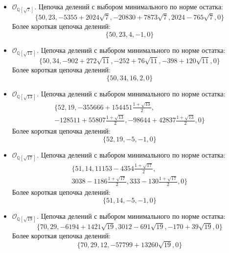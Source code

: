 \documentclass[_00_dissertation.tex]{subfiles}
\begin{document}
\begin{itemize}
    \item $\mathcal{O}_{\mathbb{Q}[\sqrt{7}]}$.
    Цепочка делений с выбором минимального по норме остатка:
    \begin{equation*}
        \{50, 23, -5355+2024\sqrt{7}, -20830+7873\sqrt{7}, 2024-765\sqrt{7}, 0\}
    \end{equation*}
    Более короткая цепочка делений:
    \begin{equation*}
        \{50, 23, 4, -1, 0\}
    \end{equation*}

    \item $\mathcal{O}_{\mathbb{Q}[\sqrt{11}]}$.
    Цепочка делений с выбором минимального по норме остатка:
    \begin{equation*}
        \{50, 34, -902+272\sqrt{11}, -252+76\sqrt{11}, -398+120\sqrt{11}, 0\}
    \end{equation*}
    Более короткая цепочка делений:
    \begin{equation*}
        \{50, 34, 16, 2, 0\}
    \end{equation*}

    \item $\mathcal{O}_{\mathbb{Q}[\sqrt{13}]}$.
    Цепочка делений с выбором минимального по норме остатка:
    \begin{multline*}
        \{52, 19, -355666+154451\frac{1+\sqrt{13}}{2},\\
        -128511+55807\frac{1+\sqrt{13}}{2}, -98644+42837\frac{1+\sqrt{13}}{2}, 0\}
    \end{multline*}
    Более короткая цепочка делений:
    \begin{equation*}
        \{52, 19, -5, -1, 0\}
    \end{equation*}

    \item $\mathcal{O}_{\mathbb{Q}[\sqrt{17}]}$.
    Цепочка делений с выбором минимального по норме остатка:
    \begin{multline*}
        \{51, 14, 11153-4354\frac{1+\sqrt{17}}{2},\\
        3038-1186\frac{1+\sqrt{17}}{2}, 333-130\frac{1+\sqrt{17}}{2}, 0\}
    \end{multline*}
    Более короткая цепочка делений:
    \begin{equation*}
        \{51, 14, -5, -1, 0\}
    \end{equation*}

    \item $\mathcal{O}_{\mathbb{Q}[\sqrt{19}]}$.
    Цепочка делений с выбором минимального по норме остатка:
    \begin{equation*}
        \{70, 29, -6194+1421\sqrt{19}, 3012-691\sqrt{19}, -170+39\sqrt{19}, 0\}
    \end{equation*}
    Более короткая цепочка делений:
    \begin{equation*}
        \{70, 29, 12, -57799+13260\sqrt{19}, 0\}
    \end{equation*}


\end{itemize}
\end{document}
